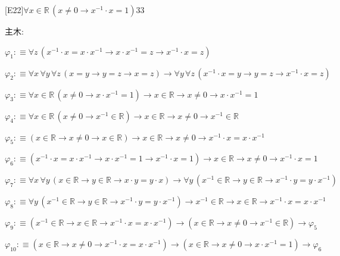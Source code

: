 \begin{fullproof}{[E22]}{$\forall x \in \mathbb{R}\,(x \neq 0 \to x^{-1} \cdot x = 1)$}{33}
\begin{ptree}
\end{ptree}
\noindent 主木:
\begin{ptree}
\noLine
{}
\noLine
{}
\end{ptree}
\begin{abbrevlist}
\item $\varphi_{1} :\equiv \forall z\,(x^{-1} \cdot x = x \cdot x^{-1} \to x \cdot x^{-1} = z \to x^{-1} \cdot x = z)$
\item $\varphi_{2} :\equiv \forall x\,\forall y\,\forall z\,(x = y \to y = z \to x = z) \to \forall y\,\forall z\,(x^{-1} \cdot x = y \to y = z \to x^{-1} \cdot x = z)$
\item $\varphi_{3} :\equiv \forall x \in \mathbb{R}\,(x \neq 0 \to x \cdot x^{-1} = 1) \to x \in \mathbb{R} \to x \neq 0 \to x \cdot x^{-1} = 1$
\item $\varphi_{4} :\equiv \forall x \in \mathbb{R}\,(x \neq 0 \to x^{-1} \in \mathbb{R}) \to x \in \mathbb{R} \to x \neq 0 \to x^{-1} \in \mathbb{R}$
\item $\varphi_{5} :\equiv (x \in \mathbb{R} \to x \neq 0 \to x \in \mathbb{R}) \to x \in \mathbb{R} \to x \neq 0 \to x^{-1} \cdot x = x \cdot x^{-1}$
\item $\varphi_{6} :\equiv (x^{-1} \cdot x = x \cdot x^{-1} \to x \cdot x^{-1} = 1 \to x^{-1} \cdot x = 1) \to x \in \mathbb{R} \to x \neq 0 \to x^{-1} \cdot x = 1$
\item $\varphi_{7} :\equiv \forall x\,\forall y\,(x \in \mathbb{R} \to y \in \mathbb{R} \to x \cdot y = y \cdot x) \to \forall y\,(x^{-1} \in \mathbb{R} \to y \in \mathbb{R} \to x^{-1} \cdot y = y \cdot x^{-1})$
\item $\varphi_{8} :\equiv \forall y\,(x^{-1} \in \mathbb{R} \to y \in \mathbb{R} \to x^{-1} \cdot y = y \cdot x^{-1}) \to x^{-1} \in \mathbb{R} \to x \in \mathbb{R} \to x^{-1} \cdot x = x \cdot x^{-1}$
\item $\varphi_{9} :\equiv (x^{-1} \in \mathbb{R} \to x \in \mathbb{R} \to x^{-1} \cdot x = x \cdot x^{-1}) \to (x \in \mathbb{R} \to x \neq 0 \to x^{-1} \in \mathbb{R}) \to \varphi_{5}$
\item $\varphi_{10} :\equiv (x \in \mathbb{R} \to x \neq 0 \to x^{-1} \cdot x = x \cdot x^{-1}) \to (x \in \mathbb{R} \to x \neq 0 \to x \cdot x^{-1} = 1) \to \varphi_{6}$
\end{abbrevlist}
\end{fullproof}

